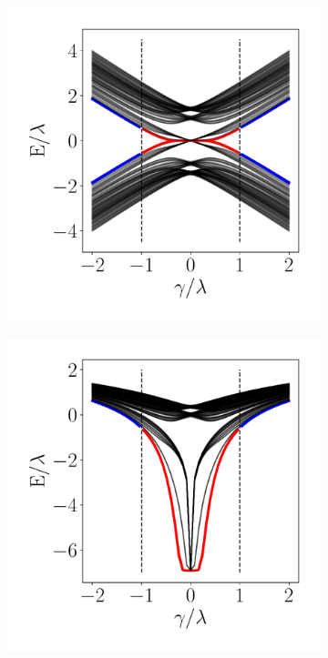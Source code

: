 \begin{figure}[h!]
     \begin{minipage}[h!]{0.9\textwidth}
         \begin{subfigure}[b!]{0.3 \textwidth}
             \caption{}
             \includegraphics[width=\textwidth]{Imagenes/Resultados_Hoti_Fractal/bands_square_shh_0.1.pdf}
             \label{}
         \end{subfigure}\hspace*{-0.5em}
         \begin{subfigure}[b!]{0.3 \textwidth}
             \caption{}
             \includegraphics[width=\textwidth]{Imagenes/Resultados_Hoti_Fractal/bands_square_shh_log0.1.pdf}

\end{subfigure}
\end{minipage}
\end{figure}
